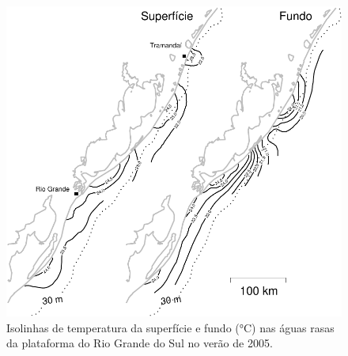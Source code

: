 \documentclass[a4paper,11pt,twoside,showtrims,onecolumn,openright,final]{memoir}
\begin{document}
\begin{figure}
\begin{center}
\includegraphics[height=0.6\textheight]{MAPA_TEMPERATURA}
\end{center}
\caption[Isolinhas de temperatura da superfície e fundo]
	{Isolinhas de temperatura da superfície e fundo (°C) nas águas rasas da
         plataforma do Rio Grande do Sul no verão de 2005.}
\label{fig:temperatura-sup-e-fundo}
\end{figure}



%
\end{document}
